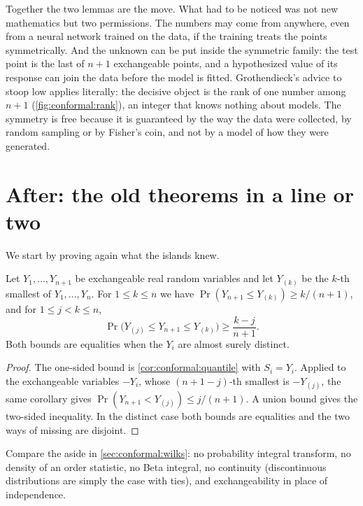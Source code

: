 \begin{refsection}
Together the two lemmas are the move. What had to be noticed was not new mathematics but two permissions. The numbers may come from anywhere, even from a neural network trained on the data, if the training treats the points symmetrically. And the unknown can be put inside the symmetric family: the test point is the last of $n+1$ exchangeable points, and a hypothesized value of its response can join the data before the model is fitted. Grothendieck's advice to stoop low applies literally: the decisive object is the rank of one number among $n+1$ (\cref{fig:conformal:rank}), an integer that knows nothing about models. The symmetry is free because it is guaranteed by the way the data were collected, by random sampling or by Fisher's coin, and not by a model of how they were generated.

\section{After: the old theorems in a line or two}\label{sec:conformal:after-old}

We start by proving again what the islands knew.

\begin{corollary}\label{cor:conformal:orderstat}
Let $Y_1,\dots,Y_{n+1}$ be exchangeable real random variables and let $Y_{(k)}$ be the $k$-th smallest of $Y_1,\dots,Y_n$. For $1\le k\le n$ we have $\Pr(Y_{n+1}\le Y_{(k)})\ge k/(n+1)$, and for $1\le j<k\le n$,
\[
\Pr\bigl(Y_{(j)}\le Y_{n+1}\le Y_{(k)}\bigr)\ge\frac{k-j}{n+1}.
\]
Both bounds are equalities when the $Y_i$ are almost surely distinct.
\end{corollary}

\begin{proof}
The one-sided bound is \cref{cor:conformal:quantile} with $S_i=Y_i$. Applied to the exchangeable variables $-Y_i$, whose $(n+1-j)$-th smallest is $-Y_{(j)}$, the same corollary gives $\Pr(Y_{n+1}<Y_{(j)})\le j/(n+1)$. A union bound gives the two-sided inequality. In the distinct case both bounds are equalities and the two ways of missing are disjoint.
\end{proof}

Compare the aside in \cref{sec:conformal:wilks}: no probability integral transform, no density of an order statistic, no Beta integral, no continuity (discontinuous distributions are simply the case with ties), and exchangeability in place of independence.


\end{refsection}
